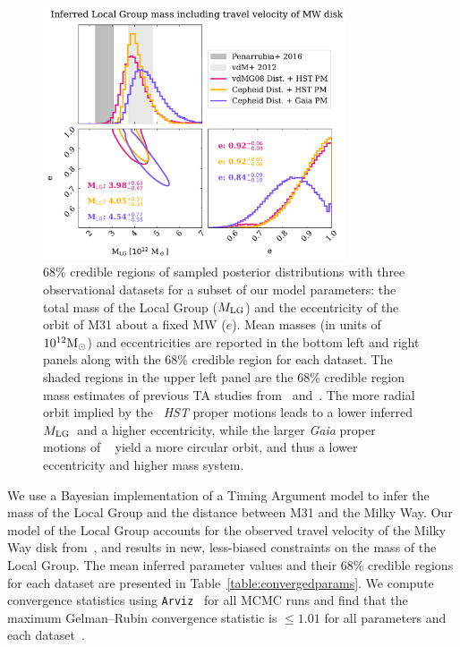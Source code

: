 \documentclass[twocolumn]{aastex631}
\newcommand{\mlg}{\ensuremath{M_{\rm LG}}}
\begin{document}
\begin{figure}[htb]
  \centering
  \includegraphics[width=0.8\textwidth]
  {analyze-runs-contour.pdf}
  \caption{\label{fig:contour} 68\% credible regions of sampled posterior
  distributions with three observational datasets for a subset of our model
  parameters: the total mass of the Local Group (\mlg)
  and the eccentricity of the orbit of M31 about a fixed MW ($e$).
  Mean masses (in units of $10^{12}\mathrm{M}_\odot$) and eccentricities are reported in
  the bottom left and right panels along with the 68\% credible region for each
  dataset.
  The shaded regions in the upper left panel are the 68\% credible region mass
  estimates of previous TA studies from~\cite{vdm2012}
  and~\cite{Penarrubia2016}.
  The more radial orbit implied by the~\cite{vdm2012} \textit{HST} proper
  motions leads to a lower inferred \mlg\ and a higher
  eccentricity, while the larger \textit{Gaia} proper motions of
  ~\cite{Salomon2021} yield a more circular orbit, and thus a lower eccentricity
   and higher mass system.
   }
\end{figure}

We use a Bayesian implementation of a Timing Argument model to infer the mass of
the Local Group and the distance between M31 and the Milky Way.
Our model of the Local Group accounts for the observed travel velocity of
the Milky Way disk from~\cite{Petersen2021}, and results in new,
less-biased constraints on the mass of the Local Group.
The mean inferred parameter values and their 68\% credible regions for each
dataset are presented in Table~\ref{table:convergedparams}.
We compute convergence statistics using \texttt{Arviz}~\citep{arviz} for all
MCMC runs and find that the maximum Gelman--Rubin convergence statistic is
$\leq1.01$ for all parameters and each dataset~\citep{GelmanRubin1992}.
\end{document}
